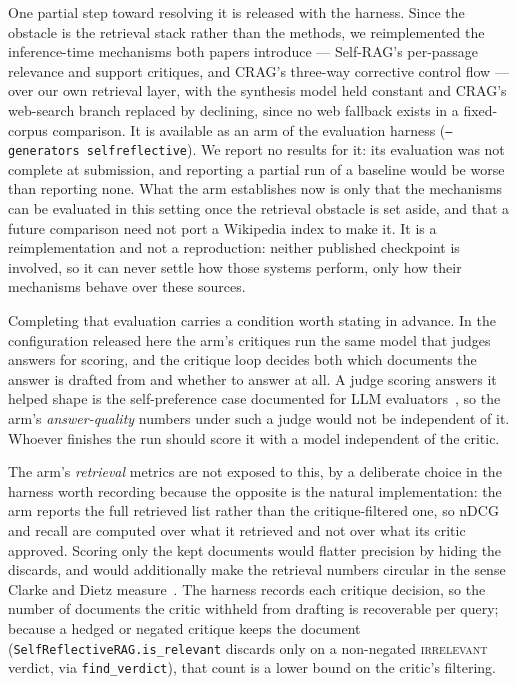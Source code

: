 \documentclass[acmsmall,review,anonymous,screen]{acmart}
\begin{document}
One partial step toward resolving it is released with the harness. Since the
obstacle is the retrieval stack rather than the methods, we reimplemented the
inference-time mechanisms both papers introduce --- Self-RAG's per-passage
relevance and support critiques, and CRAG's three-way corrective control flow
--- over our own retrieval layer, with the synthesis model held constant and
CRAG's web-search branch replaced by declining, since no web fallback exists in
a fixed-corpus comparison. It is available as an arm of the evaluation harness
(\texttt{--generators selfreflective}). We report no results for it: its
evaluation was not complete at submission, and reporting a partial run of a
baseline would be worse than reporting none. What the arm establishes now is
only that the mechanisms can be evaluated in this setting once the retrieval
obstacle is set aside, and that a future comparison need not port a Wikipedia
index to make it. It is a reimplementation and not a reproduction: neither
published checkpoint is involved, so it can never settle how those systems
perform, only how their mechanisms behave over these sources.

Completing that evaluation carries a condition worth stating in advance. In the
configuration released here the arm's critiques run the same model that judges
answers for scoring, and the critique loop decides both which documents the
answer is drafted from and whether to answer at all. A judge scoring answers it
helped shape is the self-preference case documented for LLM
evaluators~\cite{panickssery2024self,zheng2023judge}, so the arm's
\emph{answer-quality} numbers under such a judge would not be independent of it.
Whoever finishes the run should score it with a model independent of the critic.

The arm's \emph{retrieval} metrics are not exposed to this, by a deliberate
choice in the harness worth recording because the opposite is the natural
implementation: the arm reports the full retrieved list rather than the
critique-filtered one, so nDCG and recall are computed over what it retrieved
and not over what its critic approved. Scoring only the kept documents would
flatter precision by hiding the discards, and would additionally make the
retrieval numbers circular in the sense Clarke and Dietz
measure~\cite{clarke2024cannot}. The harness records each critique decision, so
the number of documents the critic withheld from drafting is recoverable per
query; because a hedged or negated critique keeps the document
(\texttt{SelfReflectiveRAG.is\_relevant} discards only on a non-negated
\textsc{irrelevant} verdict, via \texttt{find\_verdict}), that count is a lower
bound on the critic's filtering.
\end{document}
